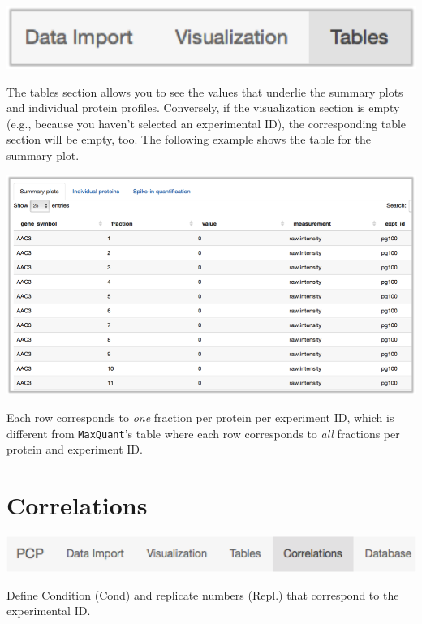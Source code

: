 \documentclass[letterpaper, twocolumn, 9pt]{article}
\begin{document}
\includegraphics[scale=.5]{figures/ss_appOverview03.png}

The tables section allows you to see the values that underlie the summary plots and individual protein profiles.
Conversely, if the visualization section is empty (e.g., because you haven't selected an experimental ID), the corresponding table section will be empty, too.
The following example shows the table for the summary plot.

\begin{center}
\includegraphics[width=.99\columnwidth]{figures/ss_table01.png}
\end{center}

Each row corresponds to \emph{one} fraction per protein per experiment ID, which is different from \texttt{MaxQuant}'s table where each row corresponds to \textit{all} fractions per protein and experiment ID. 

\section{Correlations}


\includegraphics[width=\columnwidth]{figures/ss_appOverview05.png}

Define Condition (\textsf{Cond}) and replicate numbers (\textsf{Repl.}) that correspond to the experimental ID.

\end{document}
